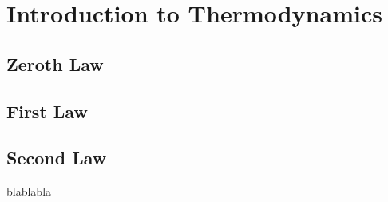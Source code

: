
\chapter{Introduction to Thermodynamics}


\section{Zeroth Law}\label{zeroth_law}



\section{First Law}\label{first_law}


\section{Second Law}\label{second_law}





blablabla \citep{batchelor_1967}
